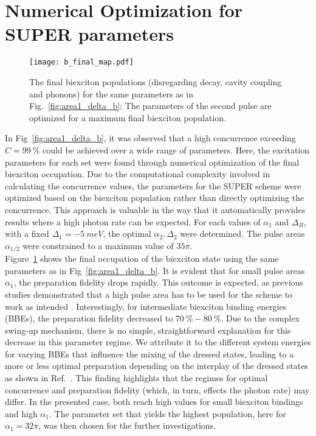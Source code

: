 \documentclass[%
 reprint,superscriptaddress,
 amsmath,amssymb,
 aps]{revtex4-2}
\begin{document}
\section{Numerical Optimization for SUPER parameters}
\begin{figure}
    \centering
    \texttt{[image: b\_final\_map.pdf]}
    \caption{The final biexciton populations (disregarding decay, cavity coupling and phonons) for the same parameters as in Fig.~\ref{fig:area1_delta_b}: The parameters of the second pulse are optimized for a maximum final biexciton population.}
    \label{fig:b_final_values}
\end{figure}
In Fig~\ref{fig:area1_delta_b}, it was observed that a high concurrence exceeding $C=\SI{99}{\percent}$ could be achieved over a wide range of parameters. Here, the excitation parameters for each set were found through numerical optimization of the final biexciton occupation. Due to the computational complexity involved in calculating the concurrence values, the parameters for the SUPER scheme were optimized based on the biexciton population rather than directly optimizing the concurrence.
This approach is valuable in the way that it automatically provides results where a high photon rate can be expected. For each values of $\alpha_1$ and $\Delta_B$, with a fixed $\Delta_1=\SI{-5}{meV}$, the optimal $\alpha_2,\Delta_2$ were determined. The pulse areas $\alpha_{1/2}$ were constrained to a maximum value of $35\pi$.\\
Figure~\ref{fig:b_final_values} shows the final occupation of the biexciton state using the same parameters as in Fig~\ref{fig:area1_delta_b}. It is evident that for small pulse areas $\alpha_1$, the preparation fidelity drops rapidly. This outcome is expected, as previous studies demonstrated that a high pulse area has to be used for the scheme to work as intended \cite{bracht21swingup,bracht2023dressed}. Interestingly, for intermediate biexciton binding energies (BBEs), the preparation fidelity decreased to $\SI{70}{\percent}-\SI{80}{\percent}$. Due to the complex swing-up mechanism, there is no simple, straightforward explanation for this decrease in this parameter regime. We attribute it to the different system energies for varying BBEs that influence the mixing of the dressed states, leading to a more or less optimal preparation depending on the interplay of the dressed states as shown in Ref.~\cite{bracht2023dressed}. This finding highlights that the regimes for optimal concurrence and preparation fidelity (which, in turn, effects the photon rate) may differ. In the presented case, both reach high values for small biexciton bindings and high $\alpha_1$. The parameter set that yields the highest population, here for $\alpha_1=32\pi$, was then chosen for the further investigations.
\end{document}
